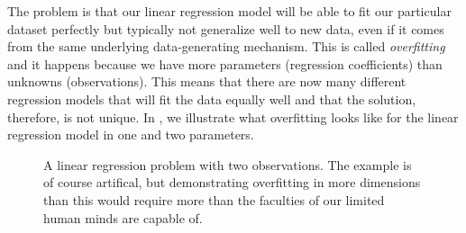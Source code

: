 The problem is that our linear regression model will be able to fit our particular dataset perfectly but typically not generalize well to new data, even if it comes from the same underlying data-generating mechanism. This is called \emph{overfitting} and it happens because we have more parameters (regression coefficients) than unknowns (observations). This means that there are now many different regression models that will fit the data equally well and that the solution, therefore, is not unique. In , we illustrate what overfitting looks like for the linear regression model in one and two parameters.

\begin{figure}
  \centering
  \hfill%
  \caption{%
    A linear regression problem with two observations. The example is of course artifical, but demonstrating overfitting in more dimensions than this would require more than the faculties of our limited human minds are capable of.
  }
  \label{fig:overfitting}
\end{figure}

